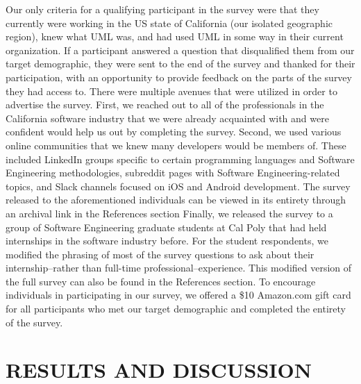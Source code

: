 \documentclass[letterpaper, 10 pt, conference]{ieeeconf}  %
\begin{document}
Our only criteria for a qualifying participant in the survey were that they currently were working in the US state of California (our isolated geographic region), knew what UML was, and had used UML in some way in their current organization. If a participant answered a question that disqualified them from our target demographic, they were sent to the end of the survey and thanked for their participation, with an opportunity to provide feedback on the parts of the survey they had access to. There were multiple avenues that were utilized in order to advertise the survey. First, we reached out to all of the professionals in the California software industry that we were already acquainted with and were confident would help us out by completing the survey. Second, we used various online communities that we knew many developers would be members of. These included LinkedIn groups specific to certain programming languages and Software Engineering methodologies, subreddit pages with Software Engineering-related topics, and Slack channels focused on iOS and Android development. The survey released to the aforementioned individuals can be viewed in its entirety through an archival link in the References section\cite{c8} Finally, we released the survey to a group of Software Engineering graduate students at Cal Poly that had held internships in the software industry before. For the student respondents, we modified the phrasing of most of the survey questions to ask about their internship--rather than full-time professional--experience. This modified version of the full survey can also be found in the References section\cite{c9}. To encourage individuals in participating in our survey, we offered a \$10 Amazon.com gift card for all participants who met our target demographic and completed the entirety of the survey. 

\section{RESULTS AND DISCUSSION}
\end{document}
